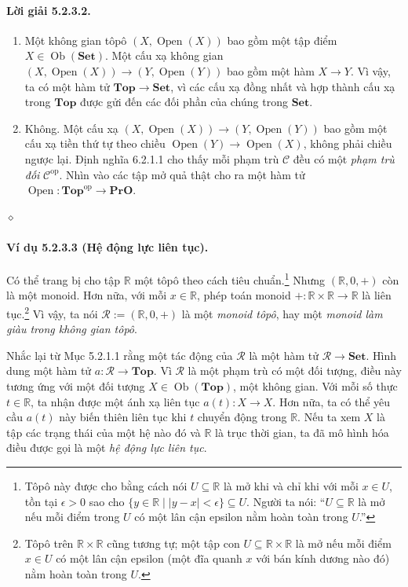 \paragraph{Lời giải 5.2.3.2.}
\begin{enumerate}[label=\alph*.]
\item Một không gian tôpô $(X,\operatorname{Open}(X))$ bao gồm một tập điểm $X\in\operatorname{Ob}(\mathbf{Set})$. Một cấu xạ không gian $(X,\operatorname{Open}(X))\to(Y,\operatorname{Open}(Y))$ bao gồm một hàm $X\to Y$. Vì vậy, ta có một hàm tử $\mathbf{Top}\to\mathbf{Set}$, vì các cấu xạ đồng nhất và hợp thành cấu xạ trong $\mathbf{Top}$ được gửi đến các đối phần của chúng trong $\mathbf{Set}$.
\item Không. Một cấu xạ $(X,\operatorname{Open}(X))\to(Y,\operatorname{Open}(Y))$ bao gồm một cấu xạ tiền thứ tự theo chiều $\operatorname{Open}(Y)\to\operatorname{Open}(X)$, không phải chiều ngược lại. Định nghĩa 6.2.1.1 cho thấy mỗi phạm trù $\mathcal C$ đều có một \emph{phạm trù đối} $\mathcal C^{\mathrm{op}}$. Nhìn vào các tập mở quả thật cho ra một hàm tử $\operatorname{Open}:\mathbf{Top}^{\mathrm{op}}\to\mathbf{PrO}$.
\end{enumerate}\hfill$\diamond$
\paragraph{Ví dụ 5.2.3.3 (Hệ động lực liên tục).} Có thể trang bị cho tập $\mathbb R$ một tôpô theo cách tiêu chuẩn.\footnote{Tôpô này được cho bằng cách nói $U\subseteq\mathbb R$ là mở khi và chỉ khi với mỗi $x\in U$, tồn tại $\epsilon>0$ sao cho $\{y\in\mathbb R\mid |y-x|<\epsilon\}\subseteq U$. Người ta nói: ``$U\subseteq\mathbb R$ là mở nếu mỗi điểm trong $U$ có một lân cận epsilon nằm hoàn toàn trong $U$.''} Nhưng $(\mathbb R,0,+)$ còn là một monoid. Hơn nữa, với mỗi $x\in\mathbb R$, phép toán monoid
$+:\mathbb R\times\mathbb R\to\mathbb R$ là liên tục.\footnote{Tôpô trên $\mathbb R\times\mathbb R$ cũng tương tự; một tập con $U\subseteq\mathbb R\times\mathbb R$ là mở nếu mỗi điểm $x\in U$ có một lân cận epsilon (một đĩa quanh $x$ với bán kính dương nào đó) nằm hoàn toàn trong $U$.} Vì vậy, ta nói $\mathcal R:=(\mathbb R,0,+)$ là một \emph{monoid tôpô}, hay một \emph{monoid làm giàu trong không gian tôpô}.

Nhắc lại từ Mục 5.2.1.1 rằng một tác động của $\mathcal R$ là một hàm tử $\mathcal R\to\mathbf{Set}$. Hình dung một hàm tử $a:\mathcal R\to\mathbf{Top}$. Vì $\mathcal R$ là một phạm trù có một đối tượng, điều này tương ứng với một đối tượng $X\in\operatorname{Ob}(\mathbf{Top})$, một không gian. Với mỗi số thực $t\in\mathbb R$, ta nhận được một ánh xạ liên tục $a(t):X\to X$. Hơn nữa, ta có thể yêu cầu $a(t)$ này biến thiên liên tục khi $t$ chuyển động trong $\mathbb R$. Nếu ta xem $X$ là tập các trạng thái của một hệ nào đó và $\mathbb R$ là trục thời gian, ta đã mô hình hóa điều được gọi là một \emph{hệ động lực liên tục}.
